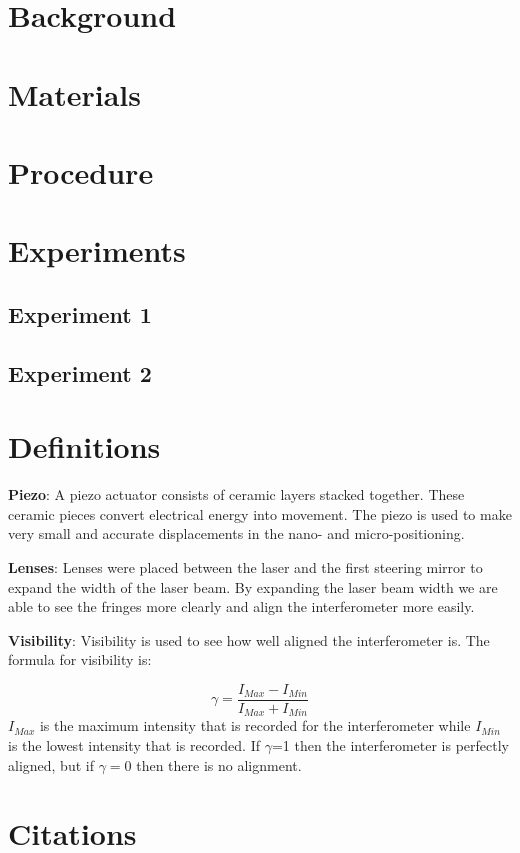 \documentclass[twocolumn]{article}
\begin{document}
  


 
 \tableofcontents



\section{Background}  

\section{Materials}
		
\section{Procedure}
		
\section{Experiments}
	\subsection{Experiment 1}
	\subsection{Experiment 2}
\appendix
\section{Definitions}

\textbf{Piezo}:
    A piezo actuator consists of ceramic layers stacked together. These ceramic pieces convert electrical energy into movement. The piezo is used to make very small and accurate displacements in the nano- and micro-positioning.

\textbf{Lenses}:
    Lenses were placed between the laser and the first steering mirror to expand the width of the laser beam. By expanding the laser beam width we are able to see the fringes more clearly and align the interferometer more easily.
    
%
\textbf{Visibility}:
    Visibility is used to see how well aligned the interferometer is. The formula for visibility is:

     \begin{equation}\label{eqn:Visibility}  
        \gamma= \frac{I_{Max} - I_{Min}}{I_{Max} + I_{Min}}
     \end{equation}    
%
$I_{Max}$ is the maximum intensity that is recorded for the interferometer while $I_{Min}$ is the lowest intensity that is recorded.  If $\gamma$=1 then the interferometer is perfectly aligned, but if $\gamma=0$ then there is no alignment. 

\section{Citations}

 
\end{document}
